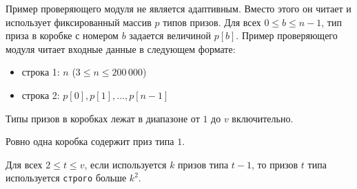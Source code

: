Пример проверяющего модуля не является адаптивным. Вместо этого он читает и использует
фиксированный массив $p$ типов призов. Для всех $0 \leq b \leq n - 1$, тип приза в коробке с
номером $b$ задается величиной $p[b]$. Пример проверяющего модуля читает входные данные в следующем формате:

\begin{itemize}
\item строка 1: $n$ ($3 \leq n \leq 200\,000$)
\item строка 2: $p[0], p[1], \ldots, p[n - 1]$
\end{itemize}

Типы призов в коробках лежат в диапазоне от $1$ до $v$ включительно.

Ровно одна коробка содержит приз типа $1$.

Для всех $2 \le t \le v$, если используется $k$ призов типа $t - 1$, то призов $t$ типа
используется \texttt{строго} больше $k ^ 2$.
